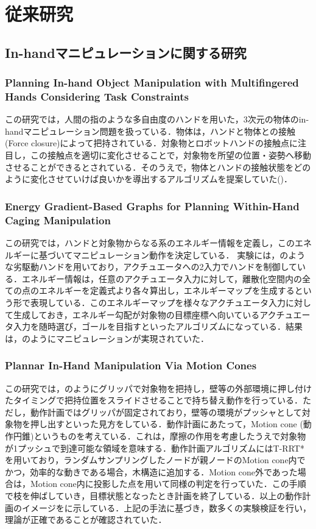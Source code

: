\documentclass[a4paper,twoside,12pt,papersize, dvipdfmx]{iirthesis}
\begin{document}
\section{従来研究}\label{sec::intro::relatedresearch}
\subsection{In-handマニピュレーションに関する研究}
\subsubsection{Planning In-hand Object Manipulation with Multifingered Hands Considering Task Constraints \cite{Hertkorn2013}}
この研究では，人間の指のような多自由度のハンドを用いた，3次元の物体のin-handマニピュレーション問題を扱っている．物体は，ハンドと物体との接触(Force closure)によって把持されている．対象物とロボットハンドの接触点に注目し，この接触点を適切に変化させることで，対象物を所望の位置・姿勢へ移動させることができるとされている．そのうえで，物体とハンドの接触状態をどのように変化させていけば良いかを導出するアルゴリズムを提案していた(\figref{})．

\subsubsection{Energy Gradient-Based Graphs for Planning Within-Hand Caging Manipulation \cite{Bircher2019}}
この研究では，ハンドと対象物からなる系のエネルギー情報を定義し，このエネルギーに基づいてマニピュレーション動作を決定している．
実験には，のような劣駆動ハンドを用いており，アクチュエータへの2入力でハンドを制御している．エネルギー情報は，任意のアクチュエータ入力に対して，離散化空間内の全ての点のエネルギーを定義式より各々算出し，エネルギーマップを生成するという形で表現している．このエネルギーマップを様々なアクチュエータ入力に対して生成しておき，エネルギー勾配が対象物の目標座標へ向いているアクチュエータ入力を随時選び，ゴールを目指すといったアルゴリズムになっている．結果は，のようにマニピュレーションが実現されていた．

\subsubsection{Plannar In-Hand Manipulation Via Motion Cones \cite{Chavan-dafle}}
この研究では，のようにグリッパで対象物を把持し，壁等の外部環境に押し付けたタイミングで把持位置をスライドさせることで持ち替え動作を行っている．ただし，動作計画ではグリッパが固定されており，壁等の環境がプッシャとして対象物を押し出すといった見方をしている．動作計画にあたって，Motion cone (動作円錐)というものを考えている．これは，摩擦の作用を考慮したうえで対象物が1プッシュで到達可能な領域を意味する．動作計画アルゴリズムにはT-RRT*を用いており，ランダムサンプリングしたノードが親ノードのMotion cone内でかつ，効率的な動きである場合，木構造に追加する．Motion cone外であった場合は，Motion cone内に投影した点を用いて同様の判定を行っていた．この手順で枝を伸ばしていき，目標状態となったとき計画を終了している．以上の動作計画のイメージをに示している．上記の手法に基づき，数多くの実験検証を行い，理論が正確であることが確認されていた．
\end{document}
